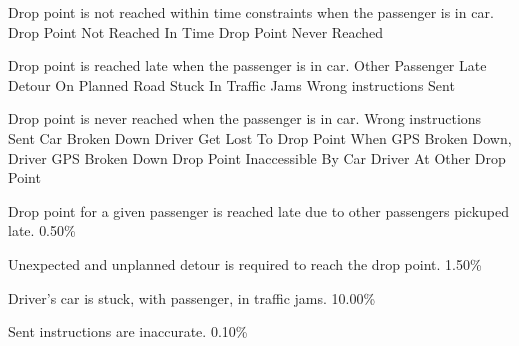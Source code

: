 
    {}
  
  \startkaosspec
  	 {Drop point is not reached within time constraints when the passenger is in car.}
  	 {Drop Point Not Reached In Time}
  	 {Drop Point Never Reached}
  \stopkaosspec
  
  \startkaosspec
  	 {Drop point is reached late when the passenger is in car.}
  	 {Other Passenger Late}
  	 {Detour On Planned Road}
  	 {Stuck In Traffic Jams}
  	 {Wrong instructions Sent}
  \stopkaosspec
  
  \startkaosspec
  	 {Drop point is never reached when the passenger is in car.}
  	 {Wrong instructions Sent}
  	 {Car Broken Down}
  	 {Driver Get Lost To Drop Point When GPS Broken Down, Driver GPS Broken Down}
  	 {Drop Point Inaccessible By Car}
  	 {Driver At Other Drop Point}
  \stopkaosspec
  
  \startkaosspec
  	 {Drop point for a given passenger is reached late due to other passengers pickuped late.}
  	 {0.50\%}
  \stopkaosspec
  
  \startkaosspec
  	 {Unexpected and unplanned detour is required to reach the drop point.}
  	 {1.50\%}
  \stopkaosspec
  
  \startkaosspec
  	 {Driver’s car is stuck, with passenger, in traffic jams.}
  	 {10.00\%}
  \stopkaosspec
  
  \startkaosspec
  	 {Sent instructions are inaccurate.}
  	 {0.10\%}
  \stopkaosspec
  
